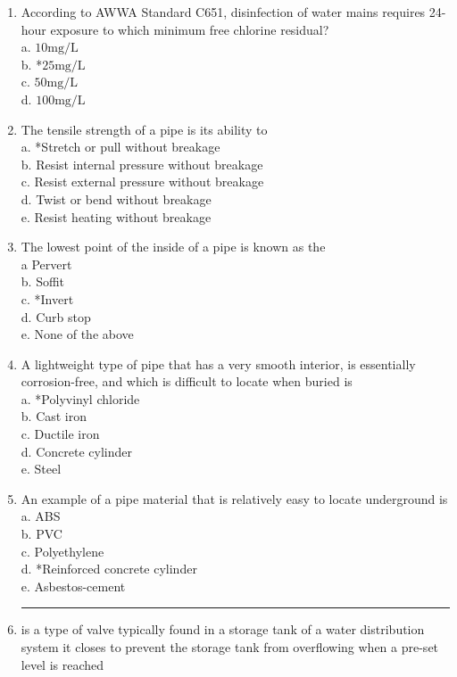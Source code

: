 \begin{enumerate}[1.]
  \item According to AWWA Standard C651, disinfection of water mains requires 24-hour exposure to which minimum free chlorine residual?\\
a. $10 \mathrm{mg} / \mathrm{L}$\\
b. *$25 \mathrm{mg} / \mathrm{L}$\\
c. $50 \mathrm{mg} / \mathrm{L}$\\
d. $100 \mathrm{mg} / \mathrm{L}$

\item The tensile strength of a pipe is its ability to\\ 
a.	*Stretch or pull without breakage\\
b.	Resist internal pressure without breakage\\
c.	Resist external pressure without breakage\\
d.	Twist or bend without breakage\\
e.	Resist heating without breakage

\item The lowest point of the inside of a pipe is known as the\\
a	Pervert\\
b.	Soffit\\
c.	*Invert\\
d.	Curb stop\\
e.	None of the above

\item A lightweight type of pipe that has a very smooth interior, is essentially corrosion-free, and which is difficult to locate when buried is\\
a.	*Polyvinyl chloride\\
b.	Cast iron\\
c.	Ductile iron\\
d.	Concrete cylinder\\
e.	Steel

\item An example of a pipe material that is relatively easy to locate underground is\\
a.	ABS\\
b.	PVC\\
c.	Polyethylene\\
d.	*Reinforced concrete cylinder\\
e.	Asbestos-cement

\item \rule{9mm}{.1pt} is a type of valve typically found in a storage tank of a water distribution system it closes to prevent the storage tank from overflowing when a pre-set level is reached\\


\end{enumerate}
